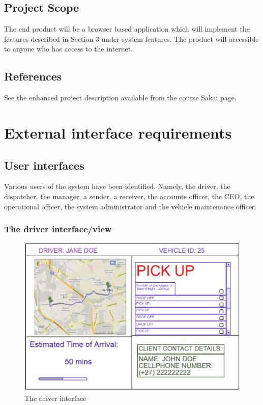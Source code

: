 \documentclass[paper=a4, fontsize=11pt]{scrartcl} %
\numberwithin{equation}{section} %
\numberwithin{figure}{section} %
\numberwithin{table}{section} %
\begin{document}
\subsection{Project Scope}
The end product will be a browser based application which will implement the features described in Section 3 under system features. The product will accessible to anyone who has access to the internet. 

\subsection{References}
See the enhanced project description available from the course Sakai page.


\section{External interface requirements}
\subsection{User interfaces}
Various users of the system have been identified. Namely, the driver, the dispatcher, the manager, a sender, a receiver, the accounts officer, the CEO, the operational officer, the system administrator and the vehicle maintenance officer.

\subsubsection{The driver interface/view}
\begin{figure}[ht!]
\centering
\includegraphics[width=5in]{pictures/driver.png}
\caption{The driver interface}
\label{Driver}
\end{figure}
\end{document}
